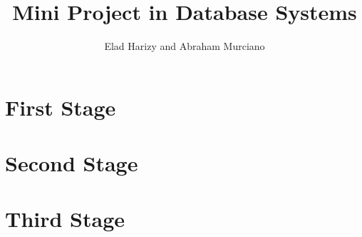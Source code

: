 \documentclass{article}
\title{Mini Project in Database Systems}
\author{Elad Harizy and Abraham Murciano}
\begin{document}
\maketitle

\tableofcontents



\section{First Stage}











\section{Second Stage}








\section{Third Stage}



\end{document}
